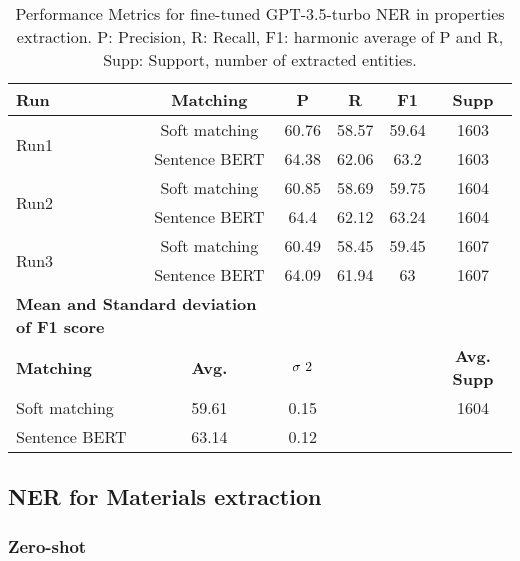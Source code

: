 \begin{table}[htbp]
\small
  \centering
  \caption{Performance Metrics for fine-tuned GPT-3.5-turbo NER in properties extraction. P: Precision, R: Recall, F1: harmonic average of P and R, Supp: Support, number of extracted entities.}
  \begin{tabular}{lccccc}
    \toprule
    \textbf{Run} & \textbf{Matching} & \textbf{P} & \textbf{R} & \textbf{F1} & \textbf{Supp} \\
    \midrule
    \multirow{2}{*}{Run1} & Soft matching & 60.76 & 58.57 & 59.64 & 1603 \\
    & Sentence BERT & 64.38 & 62.06 & 63.2 & 1603 \\
    \midrule
    \multirow{2}{*}{Run2} & Soft matching & 60.85 & 58.69 & 59.75 & 1604 \\
    & Sentence BERT & 64.4 & 62.12 & 63.24 & 1604 \\
    \midrule
    \multirow{2}{*}{Run3} & Soft matching & 60.49 & 58.45 & 59.45 & 1607 \\
    & Sentence BERT & 64.09 & 61.94 & 63 & 1607 \\
    \midrule
    \multicolumn{2}{l}{\textbf{Mean and Standard deviation of F1 score}} & & & & \\
    \midrule
    \textbf{Matching} & \textbf{Avg.} & $\sigma\textsuperscript{2}$ & & & \textbf{Avg. Supp}\\
    Soft matching & 59.61 & 0.15 & & & 1604 \\
    Sentence BERT & 63.14 & 0.12 & & & \\
    \bottomrule
  \end{tabular}
\end{table}

\clearpage
\subsection{NER for Materials extraction}

\subsubsection{Zero-shot}

